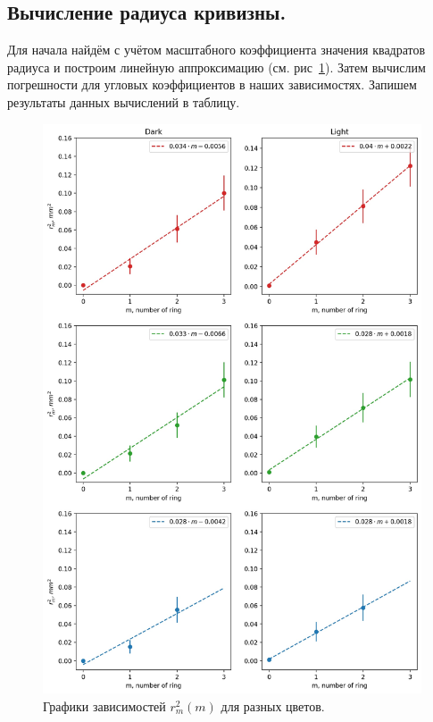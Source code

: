 \documentclass[12pt]{article}
\begin{document}
\subsection{Вычисление радиуса кривизны.}
Для начала найдём с учётом масштабного коэффициента значения квадратов радиуса и построим линейную аппроксимацию (см. рис~\ref{fig:3}). Затем вычислим погрешности для угловых коэффициентов в наших зависимостях. Запишем результаты данных вычислений в таблицу.
\begin{figure}[htbp]
	\centering
	\includegraphics[scale = 0.65]{plots/1-1.jpg}
	\caption{Графики зависимостей $r_m^2(m)$ для разных цветов.}
	\label{fig:3}
\end{figure}
\end{document}
